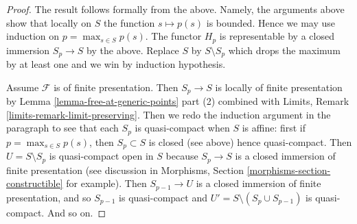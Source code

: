 \documentclass[10pt,a4paper]{amsart}
\theoremstyle{plain}
\theoremstyle{definition}
\theoremstyle{remark}
\numberwithin{equation}{subsection}
\begin{document}
\begin{proof}
\medskip\noindent
The result follows formally from the above.
Namely, the arguments above show that locally on $S$ the function
$s \mapsto p(s)$ is bounded. Hence we may use induction
on $p = \max_{s \in S} p(s)$. The functor $H_p$ is representable
by a closed immersion $S_p \to S$ by the above. Replace $S$ by
$S \setminus S_p$ which drops the maximum by at least one and
we win by induction hypothesis.

\medskip\noindent
Assume $\mathcal{F}$ is of finite presentation.
Then $S_p \to S$ is locally of finite presentation by
Lemma \ref{lemma-free-at-generic-points} part (2) combined with
Limits, Remark \ref{limits-remark-limit-preserving}.
Then we redo the induction argument in the paragraph to
see that each $S_p$ is quasi-compact when $S$ is affine:
first if $p = \max_{s \in S} p(s)$, then $S_p \subset S$
is closed (see above) hence quasi-compact. Then $U = S \setminus S_p$
is quasi-compact open in $S$ because $S_p \to S$ is a closed
immersion of finite presentation (see discussion in Morphisms, Section
\ref{morphisms-section-constructible} for example). Then $S_{p - 1} \to U$
is a closed immersion of finite presentation, and so $S_{p - 1}$
is quasi-compact and $U' = S \setminus (S_p \cup S_{p - 1})$
is quasi-compact. And so on.
\end{proof}
\end{document}
